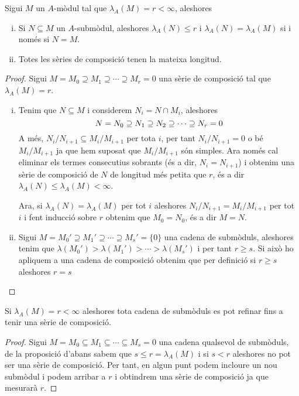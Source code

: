 \documentclass[../../../main.tex]{subfiles}
\begin{document}
\begin{prop}
\label{prop:modulDimensioFinita} Sigui $M$ un $A$-mòdul tal que $\lambda_A(M) = r<\infty$, aleshores
\begin{enumerate}[(i)]
    \item Si $N\subseteq M$ un $A$-submòdul, aleshores $\lambda_A(N)\leq r$ i $\lambda_A(N) = \lambda_A(M)$ si i només si $N = M$.
    \item Totes les sèries de composició tenen la mateixa longitud.
\end{enumerate}
\end{prop}
\begin{proof}
Sigui $M = M_0\supseteq M_1\supseteq \cdots\supseteq M_r = 0$ una sèrie de composició tal que $\lambda_A(M) = r$.
\begin{enumerate}[(i)]
    \item Tenim que $N\subseteq M$ i considerem $N_i = N\cap M_i$, aleshores
    \begin{equation}
        \notag
        N = N_0\supseteq N_1\supseteq N_2\supseteq \cdots\supseteq N_r = 0
    \end{equation}
    A més, $N_i/N_{i+1}\subseteq M_i/M_{i+1}$ per tota $i$, per tant $N_i/N_{i+1} = 0$ o bé $M_i/M_{i+1}$ ja que hem suposat que $M_i/M_{i+1}$ són simples. Ara només cal eliminar els termes consecutius sobrants (és a dir, $N_i = N_{i+1}$) i obtenim una sèrie de composició de $N$ de longitud més petita que $r$, és a dir $\lambda_A(N)\leq \lambda_A(M)<\infty$.
    
    Ara, si $\lambda_A(N) = \lambda_A(M)$ per tot $i$ aleshores $N_i/N_{i+1} = M_i/M_{i+1}$ per tot $i$ i fent inducció sobre $r$ obtenim que $M_0 = N_0$, és a dir $M = N$.
    
    \item Sigui $M = M_0'\supseteq M_1'\supseteq \cdots\supseteq M_s' = \{0\}$ una cadena de submòduls, aleshores tenim que $\lambda(M_0')>\lambda(M_1')>\cdots>\lambda(M_s')$ i per tant $r\geq s$. Si això ho apliquem a una cadena de composició obtenim que per definició si $r\geq s$ aleshores $r = s$
\end{enumerate}
\end{proof}



\begin{coro}
\label{coro:cadenaSubmodulsRefinament} Si $\lambda_A(M) = r<\infty$ aleshores tota cadena de submòduls es pot refinar fins a tenir una sèrie de composició. 
\end{coro}
\begin{proof}
Sigui $M = M_0\subseteq M_1\subseteq\cdots\subseteq M_s = 0$ una cadena qualsevol de submòduls, de la proposició d'abans sabem que $s\leq r = \lambda_A(M)$ i si $s<r$ aleshores no pot ser una sèrie de composició. Per tant, en algun punt podem incloure un nou submòdul i podem arribar a $r$ i obtindrem una sèrie de composició ja que mesurarà $r$.
\end{proof}
\end{document}
